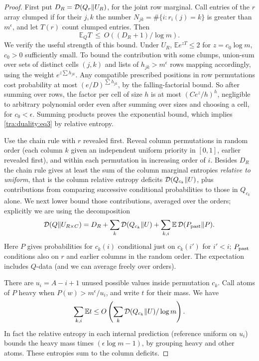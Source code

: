\begin{proof}\label{tra:duality:entropy-proof}
\label{tra:duality:clump-entropy-proof}
First put \(D_R={\cal D}(Q_r\|U_R)\), for the joint row marginal. Call entries of the \(r\) array clumped if for their \(j,k\) the number
\(N_{jk}=\#\{i:r_i(j)=k\}\) is greater than \(m^\epsilon\), and let \(T(r)\) count clumped entries. Then
\begin{equation}
                       \mathbb E_Q T\ \le\ O( (D_R+1)/\log m).       \label{tra:duality:eq3}
\end{equation}
We verify the useful strength of this bound. Under \(U_R\),
\(\mathbb E e^{z T}\le 2\) for \(z=c_0\log m\), \(c_0>0\) sufficiently small. To bound the contribution with some clumps, union-sum over sets of distinct cells \((j,k)\) and lists of \(h_{jk}>m^\epsilon\) rows mapping accordingly, using the weight \(e^{z\sum h_{jk}}\). Any compatible prescribed positions in row permutations cost probability at most \((e/D)^{\sum h_{jk}}\), by the falling-factorial bound. So after summing over rows, the factor per cell of size \(h\) is at most \((C e^z/h)^h\), negligible to arbitrary polynomial order even after summing over sizes and choosing a cell, for \(c_0<\epsilon\). Summing products proves the exponential bound, which implies \eqref{tra:duality:eq3} by relative entropy.

Use the chain rule with \(r\) revealed first. Reveal column permutations in random order (each column \(k\) given an independent uniform priority in \([0,1]\), earlier revealed first), and within each permutation in increasing order of \(i\). Besides \(D_R\) the chain rule gives at least the sum of the column marginal entropies \emph{relative to uniform}, that is the column relative entropy deficits \({\cal D}(Q_{c_k}\|U)\), plus contributions from comparing successive conditional probabilities to those in \(Q_{c_k}\) alone. We next lower bound those contributions, averaged over the orders; explicitly we are using the decomposition
\[
 {\cal D}(Q\|U_{R\times C})
 =D_R+\sum_k{\cal D}(Q_{c_k}\|U)
   +\sum_{k,i} \mathbb E\, {\cal D}(P_{\rm past}\|P).
\]
Here \(P\) gives probabilities for \(c_k(i)\) conditional just on \(c_k(i')\) for \(i'<i\); \(P_{\rm past}\) conditions also on \(r\) and earlier columns in the random order. The expectation includes \(Q\)-data (and we can average freely over orders).

There are \(u_i=A-i+1\) unused possible values inside permutation \(c_k\). Call atoms of \(P\) heavy when \(P(w)>m^\epsilon/u_i\), and write \(t\) for their mass. We have
\begin{equation}
  \sum_{k,i}\mathbb E t\le O\left(
                   \sum_k{\cal D}(Q_{c_k}\|U)/\log m\right).       \label{tra:duality:eq4}
\end{equation}
In fact the relative entropy in each internal prediction (reference uniform on \(u_i\)) bounds the heavy mass times \((\epsilon\log m-1)\), by grouping heavy and other atoms. These entropies sum to the column deficits.


\end{proof}
